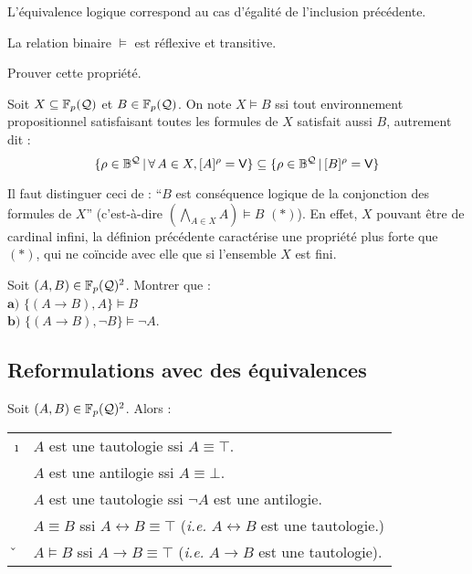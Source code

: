 		\begin{Remarque}
			L'équivalence logique correspond au cas d'égalité de l'inclusion précédente.
		\end{Remarque}
		
		 La relation binaire \(\vDash\) est réflexive et transitive.
		
		\begin{Exercice}
			Prouver cette propriété.
		\end{Exercice}
	
		\begin{Definition}
			Soit \(X \subseteq \mathbb{F}_p(\mathcal{Q})\) et \(B \in \mathbb{F}_p(\mathcal{Q})\). On note \(X \vDash B\) ssi tout environnement propositionnel satisfaisant toutes les formules de \(X\) satisfait aussi \(B\), autrement dit :
				\[
					\{\rho \in \mathbb{B}^{\mathcal{Q}} \, | \, \forall \, A \in X, [A]^\rho = \text{\sf{V}}\} \subseteq \{\rho \in \mathbb{B}^{\mathcal{Q}} \, | \, [B]^\rho = \text{\sf{V}}\}
				\]
		\end{Definition}
		
		\begin{Remarque}
			Il faut distinguer ceci de : ``\(B\) est conséquence logique de la conjonction des formules de \(X\)'' (c'est-à-dire \((\displaystyle\bigwedge\nolimits_{A \in X} A) \vDash B \) $(*)$). En effet, \(X\) pouvant être de cardinal infini, la définion précédente caractérise une propriété plus forte que $(*)$, qui ne coïncide avec elle que si l'ensemble \(X\) est fini.
		\end{Remarque}
		
		\begin{Exemples}
			Soit \((A,B) \in \mathbb{F}_p(\mathcal{Q})^2\). Montrer que : \\
				 \bdot \(\bm{a)}\) \(\{(A \rightarrow B), A\} \vDash B \) \\
				 \bdot \(\bm{b)}\) \(\{(A \rightarrow B), \neg B\} \vDash \neg A\).
		\end{Exemples}
	
	\subsection{Reformulations avec des équivalences}
		
		\begin{Proprietes}
			Soit \((A,B) \in \mathbb{F}_p(\mathcal{Q})^2\). Alors :
				\!\begin{tabular}[t]{cl}
					\i & \(A\) est une tautologie ssi \(A \equiv \top\). \\
					\ii & \(A\) est une antilogie ssi \(A \equiv \bot\). \\
					\iii & \(A\) est une tautologie ssi \(\neg A\) est une antilogie. \\
					\iv & \(A \equiv B\) ssi \(A \leftrightarrow B \equiv \top\) (\emph{i.e.} \(A \leftrightarrow B\) est une tautologie.) \\
					\v & \(A \vDash B\) ssi \(A \rightarrow B \equiv \top\) (\emph{i.e.} \(A \rightarrow B\) est une tautologie).
				\end{tabular}
		\end{Proprietes}
	
